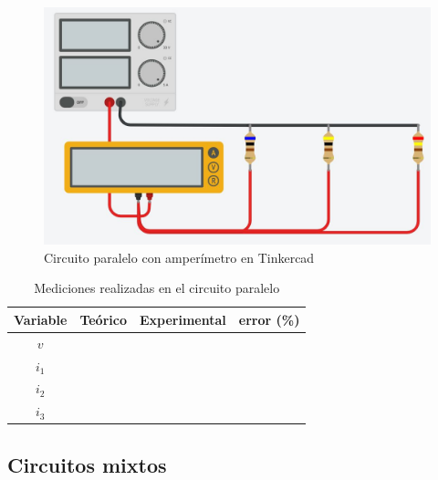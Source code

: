 \documentclass[12pt,letterpaper]{report}
\begin{document}
\begin{figure}[H]
\centering
\includegraphics[scale=0.5]{tinkercad paralelo2.JPG}
\caption{Circuito paralelo con amperímetro en Tinkercad}
\end{figure}

\begin{table}[H]
	\caption{Mediciones realizadas en el circuito paralelo}
	\label{tab:L3T2}
	\centering
	\vspace{0.5cm}
    \begin{tabularx}{12cm}{CCCC}
		\toprule
		Variable & Teórico & Experimental & error (\%)\\
		\midrule
        $v$ & & & \\
        $i_1$ & & & \\
        $i_2$ & & & \\
		$i_3$ & & & \\
		\bottomrule
	\end{tabularx}
\end{table}

\subsection{Circuitos mixtos}
\end{document}
